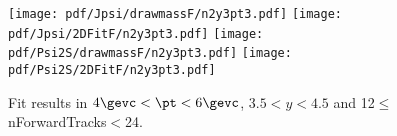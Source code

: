 \begin{figure}[H]
\begin{center}
\texttt{[image: pdf/Jpsi/drawmassF/n2y3pt3.pdf]}
\texttt{[image: pdf/Jpsi/2DFitF/n2y3pt3.pdf]}
\vspace*{-0.5cm}
\texttt{[image: pdf/Psi2S/drawmassF/n2y3pt3.pdf]}
\texttt{[image: pdf/Psi2S/2DFitF/n2y3pt3.pdf]}
\vspace*{-0.5cm}
\end{center}
\caption{Fit results in $4\gevc<\pt<6\gevc$, $3.5<y<4.5$ and 12$\leq$nForwardTracks$<$24.}
\label{Fitn2y3pt3}
\end{figure}
